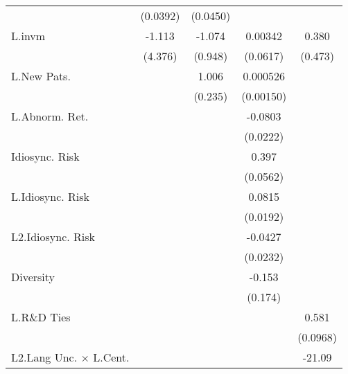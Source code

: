 \begin{table}
\begin{center}
{\begin{tabular}{l*{4}{c}}
                    &    (0.0392)         &    (0.0450)         &                     &                     \\
L.invm              &      -1.113         &      -1.074         &     0.00342         &       0.380         \\
                    &     (4.376)         &     (0.948)         &    (0.0617)         &     (0.473)         \\
L.New Pats.         &                     &       1.006\sym{***}&    0.000526         &                     \\
                    &                     &     (0.235)         &   (0.00150)         &                     \\
L.Abnorm. Ret.      &                     &                     &     -0.0803\sym{***}&                     \\
                    &                     &                     &    (0.0222)         &                     \\
Idiosync. Risk      &                     &                     &       0.397\sym{***}&                     \\
                    &                     &                     &    (0.0562)         &                     \\
L.Idiosync. Risk    &                     &                     &      0.0815\sym{***}&                     \\
                    &                     &                     &    (0.0192)         &                     \\
L2.Idiosync. Risk   &                     &                     &     -0.0427\sym{+}  &                     \\
                    &                     &                     &    (0.0232)         &                     \\
Diversity           &                     &                     &      -0.153         &                     \\
                    &                     &                     &     (0.174)         &                     \\
L.R\&D Ties         &                     &                     &                     &       0.581\sym{***}\\
                    &                     &                     &                     &    (0.0968)         \\
L2.Lang Unc. $\times$ L.Cent.&                     &                     &                     &      -21.09\sym{**} \\

\end{tabular}}
\end{center}
\end{table}
